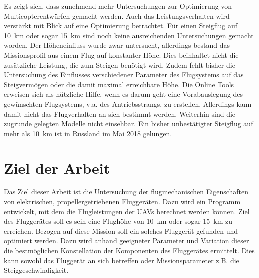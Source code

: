 Es zeigt sich, dass zunehmend mehr Untersuchungen zur Optimierung von Multicopterentwürfen gemacht werden. Auch das Leistungsverhalten wird verstärkt mit Blick auf eine Optimierung betrachtet. Für einen Steigflug auf \SI{10}{km} oder sogar \SI{15}{km} sind noch keine ausreichenden Untersuchungen gemacht worden. Der Höheneinfluss wurde zwar untersucht, allerdings bestand das Missionsprofil aus einem Flug auf konstanter Höhe. Dies beinhaltet nicht die zusätzliche Leistung, die zum Steigen benötigt wird. Zudem fehlt bisher die Untersuchung des Einflusses verschiedener Parameter des Flugsystems auf das Steigvermögen oder die damit maximal erreichbare Höhe. Die Online Tools erweisen sich als nützliche Hilfe, wenn es darum geht eine Vorabauslegung des gewünschten Flugsystems, v.a. des Antriebsstrangs, zu erstellen. Allerdings kann damit nicht das Flugverhalten an sich bestimmt werden. Weiterhin sind die zugrunde gelegten Modelle nicht einsehbar. Ein bisher unbestätigter Steigflug auf mehr als \SI{10}{km} ist \cite{Anderson.2018} in Russland im Mai 2018 gelungen. 


\section{Ziel der Arbeit}
\label{sec:ziel_der_atrbeit}
Das Ziel dieser Arbeit ist die Untersuchung der flugmechanischen Eigenschaften von elektrischen, propellergetriebenen Fluggeräten. Dazu wird ein Programm entwickelt, mit dem die Flugleistungen der UAVs berechnet werden können. Ziel des Fluggerätes soll es sein eine Flughöhe von \SI{10}{km} oder sogar \SI{15}{km} zu erreichen. Bezogen auf diese Mission soll ein solches Fluggerät gefunden und optimiert werden. Dazu wird anhand geeigneter Parameter und Variation dieser die bestmöglichen Konstellation der Komponenten des Fluggerätes ermittelt. Dies kann sowohl das Fluggerät an sich betreffen oder Missionsparameter z.B. die Steiggeschwindigkeit.

